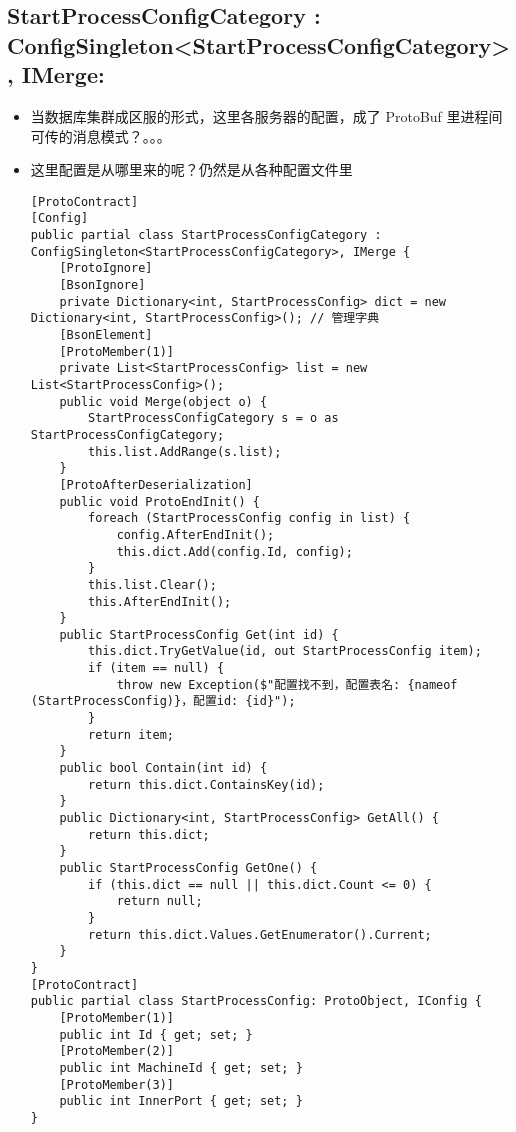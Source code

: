 \documentclass[9pt, b5paper]{article}
\begin{document}
\subsection{StartProcessConfigCategory : ConfigSingleton<StartProcessConfigCategory>, IMerge:}
\label{sec-6-2}
\begin{itemize}
\item 当数据库集群成区服的形式，这里各服务器的配置，成了 ProtoBuf 里进程间可传的消息模式？。。。
\item 这里配置是从哪里来的呢？仍然是从各种配置文件里
\begin{verbatim}
[ProtoContract]
[Config]
public partial class StartProcessConfigCategory : ConfigSingleton<StartProcessConfigCategory>, IMerge {
    [ProtoIgnore]
    [BsonIgnore]
    private Dictionary<int, StartProcessConfig> dict = new Dictionary<int, StartProcessConfig>(); // 管理字典
    [BsonElement]
    [ProtoMember(1)]
    private List<StartProcessConfig> list = new List<StartProcessConfig>();
    public void Merge(object o) {
        StartProcessConfigCategory s = o as StartProcessConfigCategory;
        this.list.AddRange(s.list);
    }
    [ProtoAfterDeserialization]        
    public void ProtoEndInit() {
        foreach (StartProcessConfig config in list) {
            config.AfterEndInit();
            this.dict.Add(config.Id, config);
        }
        this.list.Clear();
        this.AfterEndInit();
    }
    public StartProcessConfig Get(int id) {
        this.dict.TryGetValue(id, out StartProcessConfig item);
        if (item == null) {
            throw new Exception($"配置找不到，配置表名: {nameof (StartProcessConfig)}，配置id: {id}");
        }
        return item;
    }
    public bool Contain(int id) {
        return this.dict.ContainsKey(id);
    }
    public Dictionary<int, StartProcessConfig> GetAll() {
        return this.dict;
    }
    public StartProcessConfig GetOne() {
        if (this.dict == null || this.dict.Count <= 0) {
            return null;
        }
        return this.dict.Values.GetEnumerator().Current;
    }
}
[ProtoContract]
public partial class StartProcessConfig: ProtoObject, IConfig {
    [ProtoMember(1)]
    public int Id { get; set; }
    [ProtoMember(2)]
    public int MachineId { get; set; }
    [ProtoMember(3)]
    public int InnerPort { get; set; }
}
\end{verbatim}
\end{itemize}
\end{document}
